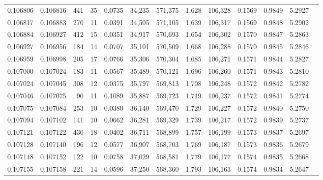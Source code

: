 \begin{tabular}{rrrrrrrrrrrrr}
0.106806 & 0.106816 &   441 &  35 &                                     0.0735 &  34,235 & 571,375 &   1,628 & 106,328 & 0.1569 & 0.9849 & 5.2927 \\
0.106817 & 0.106883 &   270 &  11 &                                     0.0391 &  34,505 & 571,105 &   1,639 & 106,317 & 0.1569 & 0.9848 & 5.2902 \\
0.106884 & 0.106927 &   412 &  15 &                                     0.0351 &  34,917 & 570,693 &   1,654 & 106,302 & 0.1570 & 0.9847 & 5.2863 \\
0.106927 & 0.106956 &   184 &  14 &                                     0.0707 &  35,101 & 570,509 &   1,668 & 106,288 & 0.1570 & 0.9845 & 5.2846 \\
0.106959 & 0.106998 &   205 &  17 &                                     0.0766 &  35,306 & 570,304 &   1,685 & 106,271 & 0.1571 & 0.9844 & 5.2827 \\
0.107000 & 0.107024 &   183 &  11 &                                     0.0567 &  35,489 & 570,121 &   1,696 & 106,260 & 0.1571 & 0.9843 & 5.2810 \\
0.107024 & 0.107045 &   308 &  12 &                                     0.0375 &  35,797 & 569,813 &   1,708 & 106,248 & 0.1572 & 0.9842 & 5.2782 \\
0.107046 & 0.107075 &    90 &  11 &                                     0.1089 &  35,887 & 569,723 &   1,719 & 106,237 & 0.1572 & 0.9841 & 5.2774 \\
0.107075 & 0.107084 &   253 &  10 &                                     0.0380 &  36,140 & 569,470 &   1,729 & 106,227 & 0.1572 & 0.9840 & 5.2750 \\
0.107094 & 0.107102 &   141 &  10 &                                     0.0662 &  36,281 & 569,329 &   1,739 & 106,217 & 0.1572 & 0.9839 & 5.2737 \\
0.107121 & 0.107122 &   430 &  18 &                                     0.0402 &  36,711 & 568,899 &   1,757 & 106,199 & 0.1573 & 0.9837 & 5.2697 \\
0.107128 & 0.107140 &   196 &  12 &                                     0.0577 &  36,907 & 568,703 &   1,769 & 106,187 & 0.1573 & 0.9836 & 5.2679 \\
0.107148 & 0.107152 &   122 &  10 &                                     0.0758 &  37,029 & 568,581 &   1,779 & 106,177 & 0.1574 & 0.9835 & 5.2668 \\
0.107155 & 0.107158 &   221 &  14 &                                     0.0596 &  37,250 & 568,360 &   1,793 & 106,163 & 0.1574 & 0.9834 & 5.2647 \\

\end{tabular}
